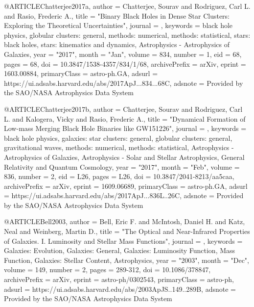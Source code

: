 \documentclass[twocolumn,tighten]{aastex63}
\begin{document}
{@ARTICLE{Chatterjee2017a,
       author = {{Chatterjee}, Sourav and {Rodriguez}, Carl L. and {Rasio}, Frederic A.},
        title = "{Binary Black Holes in Dense Star Clusters: Exploring the Theoretical Uncertainties}",
      journal = {\apj},
     keywords = {black hole physics, globular clusters: general, methods: numerical, methods: statistical, stars: black holes, stars: kinematics and dynamics, Astrophysics - Astrophysics of Galaxies},
         year = "2017",
        month = "Jan",
       volume = {834},
       number = {1},
          eid = {68},
        pages = {68},
          doi = {10.3847/1538-4357/834/1/68},
archivePrefix = {arXiv},
       eprint = {1603.00884},
 primaryClass = {astro-ph.GA},
       adsurl = {https://ui.adsabs.harvard.edu/abs/2017ApJ...834...68C},
      adsnote = {Provided by the SAO/NASA Astrophysics Data System}
}

@ARTICLE{Chatterjee2017b,
       author = {{Chatterjee}, Sourav and {Rodriguez}, Carl L. and {Kalogera}, Vicky and
         {Rasio}, Frederic A.},
        title = "{Dynamical Formation of Low-mass Merging Black Hole Binaries like GW151226}",
      journal = {\apjl},
     keywords = {black hole physics, galaxies: star clusters: general, globular clusters: general, gravitational waves, methods: numerical, methods: statistical, Astrophysics - Astrophysics of Galaxies, Astrophysics - Solar and Stellar Astrophysics, General Relativity and Quantum Cosmology},
         year = "2017",
        month = "Feb",
       volume = {836},
       number = {2},
          eid = {L26},
        pages = {L26},
          doi = {10.3847/2041-8213/aa5caa},
archivePrefix = {arXiv},
       eprint = {1609.06689},
 primaryClass = {astro-ph.GA},
       adsurl = {https://ui.adsabs.harvard.edu/abs/2017ApJ...836L..26C},
      adsnote = {Provided by the SAO/NASA Astrophysics Data System}
}

@ARTICLE{Bell2003,
       author = {{Bell}, Eric F. and {McIntosh}, Daniel H. and {Katz}, Neal and
         {Weinberg}, Martin D.},
        title = "{The Optical and Near-Infrared Properties of Galaxies. I. Luminosity and Stellar Mass Functions}",
      journal = {\apjs},
     keywords = {Galaxies: Evolution, Galaxies: General, Galaxies: Luminosity Function, Mass Function, Galaxies: Stellar Content, Astrophysics},
         year = "2003",
        month = "Dec",
       volume = {149},
       number = {2},
        pages = {289-312},
          doi = {10.1086/378847},
archivePrefix = {arXiv},
       eprint = {astro-ph/0302543},
 primaryClass = {astro-ph},
       adsurl = {https://ui.adsabs.harvard.edu/abs/2003ApJS..149..289B},
      adsnote = {Provided by the SAO/NASA Astrophysics Data System}
}

}
\end{document}
